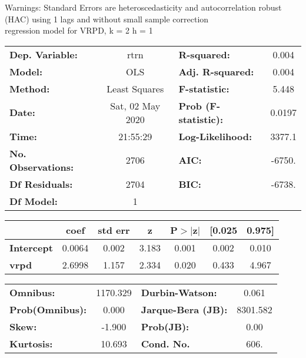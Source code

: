 Warnings: \newline
 [1] Standard Errors are heteroscedasticity and autocorrelation robust (HAC) using 1 lags and without small sample correction\\ 

regression model for VRPD, k = 2 h = 1\begin{center}
\begin{tabular}{lclc}
\toprule
\textbf{Dep. Variable:}    &       rtrn       & \textbf{  R-squared:         } &     0.004   \\
\textbf{Model:}            &       OLS        & \textbf{  Adj. R-squared:    } &     0.004   \\
\textbf{Method:}           &  Least Squares   & \textbf{  F-statistic:       } &     5.448   \\
\textbf{Date:}             & Sat, 02 May 2020 & \textbf{  Prob (F-statistic):} &   0.0197    \\
\textbf{Time:}             &     21:55:29     & \textbf{  Log-Likelihood:    } &    3377.1   \\
\textbf{No. Observations:} &        2706      & \textbf{  AIC:               } &    -6750.   \\
\textbf{Df Residuals:}     &        2704      & \textbf{  BIC:               } &    -6738.   \\
\textbf{Df Model:}         &           1      & \textbf{                     } &             \\
\bottomrule
\end{tabular}
\begin{tabular}{lcccccc}
                   & \textbf{coef} & \textbf{std err} & \textbf{z} & \textbf{P$> |$z$|$} & \textbf{[0.025} & \textbf{0.975]}  \\
\midrule
\textbf{Intercept} &       0.0064  &        0.002     &     3.183  &         0.001        &        0.002    &        0.010     \\
\textbf{vrpd}      &       2.6998  &        1.157     &     2.334  &         0.020        &        0.433    &        4.967     \\
\bottomrule
\end{tabular}
\begin{tabular}{lclc}
\textbf{Omnibus:}       & 1170.329 & \textbf{  Durbin-Watson:     } &    0.061  \\
\textbf{Prob(Omnibus):} &   0.000  & \textbf{  Jarque-Bera (JB):  } & 8301.582  \\
\textbf{Skew:}          &  -1.900  & \textbf{  Prob(JB):          } &     0.00  \\
\textbf{Kurtosis:}      &  10.693  & \textbf{  Cond. No.          } &     606.  \\
\bottomrule
\end{tabular}
\end{center}

